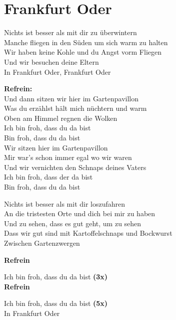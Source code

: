 \section{Frankfurt Oder}
Nichts ist besser als mit dir zu überwintern\\
Manche fliegen in den Süden um sich warm zu halten\\
Wir haben keine Kohle und du Angst vorm Fliegen\\
Und wir besuchen deine Eltern\\
In Frankfurt Oder, Frankfurt Oder

\textbf{Refrein:}\\
Und dann sitzen wir hier im Gartenpavillon\\
Was du erzählst hält mich nüchtern und warm\\
Oben am Himmel regnen die Wolken\\
Ich bin froh, dass du da bist\\
Bin froh, dass du da bist\\
Wir sitzen hier im Gartenpavillon\\
Mir war's schon immer egal wo wir waren\\
Und wir vernichten den Schnaps deines Vaters\\
Ich bin froh, dass der da bist\\
Bin froh, dass du da bist

Nichts ist besser als mit dir loszufahren\\
An die tristesten Orte und dich bei mir zu haben\\
Und zu sehen, dass es gut geht, um zu sehen\\
Dass wir gut sind mit Kartoffelschnaps und Bockwurst\\
Zwischen Gartenzwergen

\textbf{Refrein}

Ich bin froh, dass du da bist \textbf{(3x)}\\

\textbf{Refrein}

Ich bin froh, dass du da bist \textbf{(5x)}\\
In Frankfurt Oder 